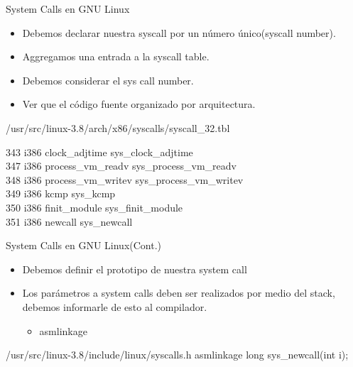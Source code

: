 \begin{frame}{System Calls en GNU Linux}
   \begin{itemize}  
   \item Debemos declarar nuestra syscall por un número único(syscall number). 
   \item Aggregamos una entrada a la syscall table.
   \item Debemos considerar el sys call number.
   \item Ver que el código fuente organizado por arquitectura.
 \end{itemize}

\begin{block}{/usr/src/linux-3.8/arch/x86/syscalls/syscall\_32.tbl}
  \begin{block}{}
     343     i386    clock\_adjtime            sys\_clock\_adjtime    \\           
     347     i386    process\_vm\_readv        sys\_process\_vm\_readv  \\          
     348     i386    process\_vm\_writev       sys\_process\_vm\_writev \\          
     349     i386    kcmp                      sys\_kcmp \\
     350     i386    finit\_module             sys\_finit\_module \\
     \alert{351     i386    newcall                   sys\_newcall} \\ 
  \end{block}

\end{block}

\end{frame}


\begin{frame}{System Calls en GNU Linux(Cont.)}
   \begin{itemize}  
   \item Debemos definir el prototipo de nuestra system call 
   \item Los parámetros a system calls deben ser realizados por medio del stack, debemos informarle de esto al compilador.
    \begin{itemize}
	 \item \alert{asmlinkage} 
    \end{itemize}   
 \end{itemize}

\begin{block}{/usr/src/linux-3.8/include/linux/syscalls.h}
asmlinkage long sys\_newcall(int i);

\end{block}

\end{frame}

